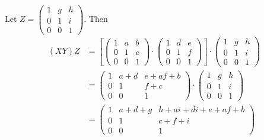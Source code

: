 \documentclass[12pt]{article}
\begin{document}
\begin{enumerate}
\begin{enumerate}
\begin{mybox}
            Let $Z=\left(\begin{array}{ccc}
                1 & g & h\\
                0 & 1 & i\\
                0 & 0 & 1 \end{array}
                \right)$.
            Then
            \begin{align*}
                (XY)Z&=
                \left[\left(\begin{array}{ccc}
                    1 & a & b\\
                    0 & 1 & c\\
                    0 & 0 & 1 \end{array}
                \right)\cdot
                \left(\begin{array}{ccc}
                    1 & d & e\\
                    0 & 1 & f\\
                    0 & 0 & 1 \end{array}
                \right)\right]\cdot
                \left(\begin{array}{ccc}
                    1 & g & h\\
                    0 & 1 & i\\
                    0 & 0 & 1 \end{array}
                \right)\\
                &=\left(\begin{array}{ccc}
                    1 & a+d & e+af+b\\
                    0 & 1 & f+c\\
                    0 & 0 & 1 \end{array}
                \right)\cdot
                \left(\begin{array}{ccc}
                        1 & g & h\\
                        0 & 1 & i\\
                        0 & 0 & 1 \end{array}
                \right)\\
                &=\left(\begin{array}{ccc}
                    1 & a+d+g & h+ai+di+e+af+b\\
                    0 & 1 & c+f+i\\
                    0 & 0 & 1 \end{array}
                \right)
            \end{align*}

\end{mybox}
\end{enumerate}
\end{enumerate}
\end{document}
